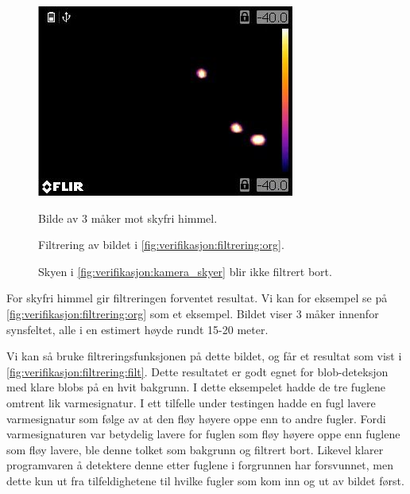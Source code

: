 \begin{figure}
    \centering
    \includegraphics[width=.42\textwidth]{verifikasjon-test/Tracking_ex/org1.JPG}
    \caption{Bilde av 3 måker mot skyfri himmel.}
    \label{fig:verifikasjon:filtrering:org}
    \vspace{0.5cm}
    
    \caption{Filtrering av bildet i \autoref{fig:verifikasjon:filtrering:org}.}
    \label{fig:verifikasjon:filtrering:filt}
    \vspace{0.5cm}
    
    \caption{Skyen i \autoref{fig:verifikasjon:kamera_skyer} blir ikke filtrert bort.}
    \label{fig:verifikasjon:filtering:sky}
\end{figure}

For skyfri himmel gir filtreringen forventet resultat. 
Vi kan for eksempel se på \autoref{fig:verifikasjon:filtrering:org} som et eksempel. 
Bildet viser 3 måker innenfor synsfeltet, alle i en estimert høyde rundt 15-20 meter.

Vi kan så bruke filtreringsfunksjonen på dette bildet, og får et resultat som vist i \autoref{fig:verifikasjon:filtrering:filt}.
Dette resultatet er godt egnet for blob-deteksjon med klare blobs på en hvit bakgrunn. 
I dette eksempelet hadde de tre fuglene omtrent lik varmesignatur. I ett tilfelle under testingen hadde en fugl lavere varmesignatur som følge av at den fløy høyere oppe enn to andre fugler.
Fordi varmesignaturen var betydelig lavere for fuglen som fløy høyere oppe enn fuglene som fløy lavere, ble denne tolket som bakgrunn og filtrert bort. 
Likevel klarer programvaren å detektere denne etter fuglene i forgrunnen har forsvunnet, men dette kun ut fra tilfeldighetene til hvilke fugler som kom inn og ut av bildet først.

